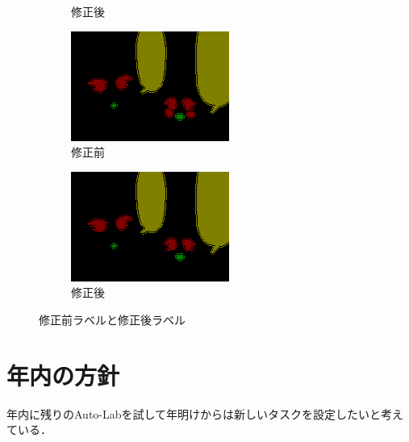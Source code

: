 \documentclass[onecolumn]{ujarticle}   %
\begin{document}
\begin{figure}[h]
\begin{subfigure}{0.45\columnwidth}
			\caption{修正後}
		\end{subfigure}
		\begin{subfigure}{0.45\columnwidth}
			\centering
			\includegraphics[width=1.0\columnwidth]{before_cheek.png}
			\caption{修正前}
		\end{subfigure}
		\begin{subfigure}{0.45\columnwidth}
			\centering
			\includegraphics[width=1.0\columnwidth]{after_cheek.png}
			\caption{修正後}
		\end{subfigure}
		\caption{修正前ラベルと修正後ラベル}
		\label{fig:fix_figure}
	\end{figure}

	\section{年内の方針}
	年内に残りのAuto-Labを試して年明けからは新しいタスクを設定したいと考えている．
\end{document}
